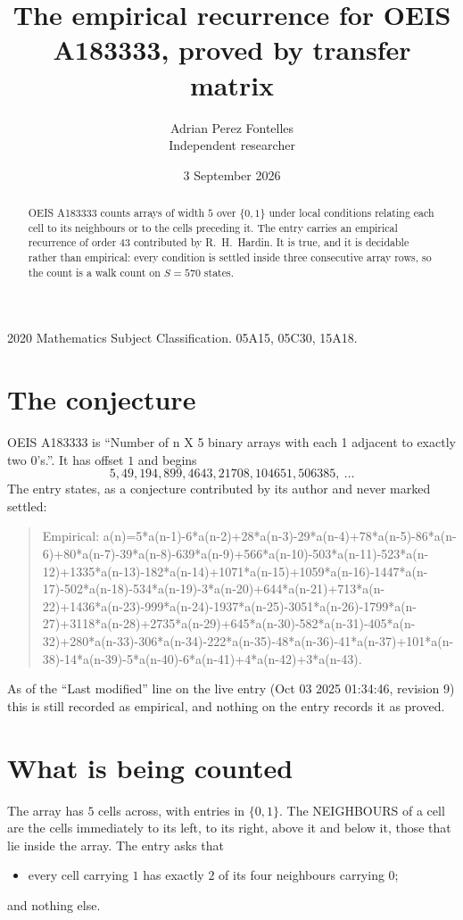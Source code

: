 \documentclass[11pt,a4paper]{article}
\title{The empirical recurrence for OEIS A183333, proved by transfer matrix}
\author{Adrian Perez Fontelles\\ \small Independent researcher}
\date{3 September 2026}
\theoremstyle{plain}
\theoremstyle{definition}
\begin{document}
\maketitle

\begin{abstract}
OEIS A183333 counts arrays of width $5$ over $\{0,1\}$ under local conditions relating each cell
to its neighbours or to the cells preceding it. The entry carries an empirical recurrence of
order $43$ contributed by R.~H.~Hardin. It is true, and it is decidable rather than
empirical: every condition is settled inside three consecutive array rows, so the count is a
walk count on $S=570$ states.
\end{abstract}

\noindent\small 2020 Mathematics Subject Classification. 05A15, 05C30, 15A18.\normalsize

\section{The conjecture}

OEIS A183333 is ``Number of n X 5 binary arrays with each 1 adjacent to exactly two 0's.''. It has offset $1$ and begins
\[
5, 49, 194, 899, 4643, 21708, 104651, 506385,\ \dots
\]
The entry states, as a conjecture contributed by its author and never marked settled:
\begin{quote}
Empirical: a(n)=5*a(n-1)-6*a(n-2)+28*a(n-3)-29*a(n-4)+78*a(n-5)-86*a(n-6)+80*a(n-7)-39*a(n-8)-639*a(n-9)+566*a(n-10)-503*a(n-11)-523*a(n-12)+1335*a(n-13)-182*a(n-14)+1071*a(n-15)+1059*a(n-16)-1447*a(n-17)-502*a(n-18)-534*a(n-19)-3*a(n-20)+644*a(n-21)+713*a(n-22)+1436*a(n-23)-999*a(n-24)-1937*a(n-25)-3051*a(n-26)-1799*a(n-27)+3118*a(n-28)+2735*a(n-29)+645*a(n-30)-582*a(n-31)-405*a(n-32)+280*a(n-33)-306*a(n-34)-222*a(n-35)-48*a(n-36)-41*a(n-37)+101*a(n-38)-14*a(n-39)-5*a(n-40)-6*a(n-41)+4*a(n-42)+3*a(n-43).
\end{quote}
As of the ``Last modified'' line on the live entry (Oct 03 2025 01:34:46, revision 9) this is still
recorded as empirical, and nothing on the entry records it as proved.

\section{What is being counted}

The array has $5$ cells across, with entries in $\{0,1\}$. The NEIGHBOURS of a cell are the
cells immediately to its left, to its right, above it and below it, those that lie inside the
array. The entry asks that
\begin{itemize}
\item every cell carrying $1$ has exactly $2$ of its four neighbours carrying $0$;
\end{itemize}
and nothing else.
\end{document}
